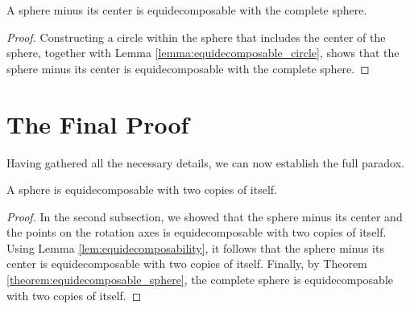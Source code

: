 \begin{theorem} \label{theorem:equidecomposable_sphere}
A sphere minus its center is equidecomposable with the complete sphere.
\end{theorem}
\begin{proof} 
Constructing a circle within the sphere that includes the center of the sphere, together with Lemma \ref{lemma:equidecomposable_circle},
shows that the sphere minus its center is equidecomposable with the complete sphere.
\end{proof}

\section{The Final Proof}

Having gathered all the necessary details, we can now establish the full paradox.
\begin{theorem}\label{thm:BanachTarski}
A sphere is equidecomposable with two copies of itself.
\end{theorem}
\begin{proof} 
In the second subsection, we showed that the sphere minus its center and the points on the rotation axes is equidecomposable with two copies of itself.
Using Lemma \ref{lem:equidecomposability}, it follows that the sphere minus its center is equidecomposable with two copies of itself.
Finally, by Theorem \ref{theorem:equidecomposable_sphere}, the complete sphere is equidecomposable with two copies of itself.
\end{proof}
